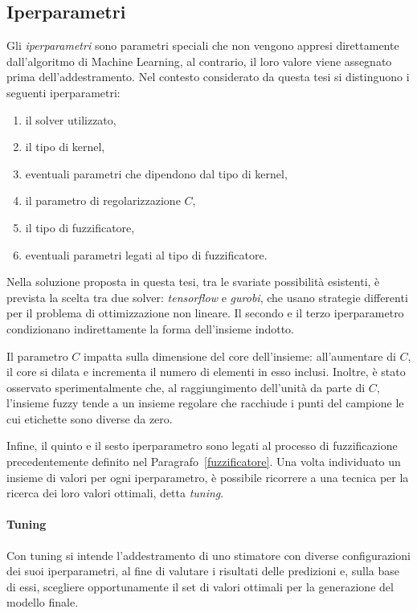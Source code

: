 \documentclass[12pt]{report}
\theoremstyle{definition}
\begin{document}
\subsection{Iperparametri}\label{hyperparameters}
Gli \textit{iperparametri} sono parametri speciali che non vengono appresi direttamente dall'algoritmo di Machine Learning, al contrario, il loro valore viene assegnato prima dell'addestramento.
Nel contesto considerato da questa tesi si distinguono i seguenti iperparametri: 
\begin{enumerate}
    \item il solver utilizzato,
    \item il tipo di kernel,
    \item eventuali parametri che dipendono dal tipo di kernel,
    \item il parametro di regolarizzazione $C$,
    \item il tipo di fuzzificatore,
    \item eventuali parametri legati al tipo di fuzzificatore.
\end{enumerate}
Nella soluzione proposta in questa tesi, tra le svariate possibilità esistenti, è prevista la scelta tra due solver: \textit{tensorflow} e \textit{gurobi}, che usano strategie differenti per il problema di ottimizzazione non lineare. Il secondo e il terzo iperparametro condizionano indirettamente la forma dell'insieme indotto.

Il parametro $C$ impatta sulla dimensione del core dell'insieme:
all'aumentare di $C$, il core si dilata e incrementa il numero di elementi in esso inclusi.
Inoltre, è stato osservato sperimentalmente che, al raggiungimento dell'unità da parte di $C$, l'insieme fuzzy tende a un insieme regolare che racchiude i punti del campione le cui etichette sono diverse da zero.

Infine, il quinto e il sesto iperparametro sono legati al processo di fuzzificazione precedentemente definito nel Paragrafo~\ref{fuzzificatore}.
Una volta individuato un insieme di valori per ogni iperparametro, è possibile ricorrere a una tecnica per la ricerca dei loro valori ottimali, detta \textit{tuning}.

\paragraph{Tuning} Con tuning si intende l'addestramento di uno stimatore con diverse configurazioni dei suoi iperparametri, al fine di valutare i risultati delle predizioni e, sulla base di essi, scegliere opportunamente il set di valori ottimali per la generazione del modello finale.
\end{document}
